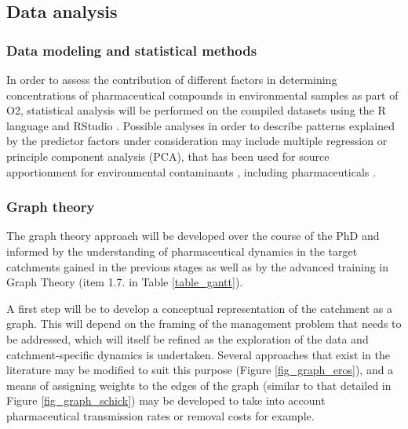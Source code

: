 \documentclass{article}
\begin{document}
\subsection{Data analysis}
\subsubsection{Data modeling and statistical methods}
In order to assess the contribution of different factors in determining concentrations of pharmaceutical compounds in environmental samples as part of O2, statistical analysis will be performed on the compiled datasets using the R language and RStudio \citep{R.Development.CoreTeam2010R:Computing.}. Possible analyses in order to describe patterns explained by the predictor factors under consideration may include multiple regression or principle component analysis (PCA), that has been used for source apportionment for environmental contaminants \citep{Giglioli2020SourceNaples}, including pharmaceuticals \citep{Jia2011}.

\subsubsection{Graph theory}
The graph theory approach will be developed over the course of the PhD and informed by the understanding of pharmaceutical dynamics in the target catchments gained in the previous stages as well as by the advanced training in Graph Theory (item 1.7. in Table \ref{table_gantt}). 

A first step will be to develop a conceptual representation of the catchment as a graph. This will depend on the framing of the management problem that needs to be addressed, which will itself be refined as the exploration of the data and catchment-specific dynamics is undertaken. Several approaches that exist in the literature may be modified to suit this purpose (Figure \ref{fig_graph_eros}), and a means of assigning weights to the edges of the graph (similar to that detailed in Figure \ref{fig_graph_schick}) may be developed to take into account pharmaceutical transmission rates or removal costs for example.
\end{document}
